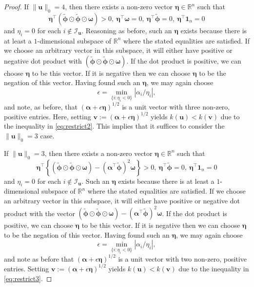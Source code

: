 \documentclass[12pt]{article}
\newcommand{\bl}[1]{{\mathbf #1}}
\newcommand{\bs}[1]{\boldsymbol #1}
\begin{document}
\begin{proof}
If $\|\bl{u}\|_0 = 4$, then there exists a non-zero vector $\bs{\eta} \in \mathbb{R}^n$ such that
\begin{equation}\label{eq:restrict2}
    \bs{\eta}^\top (\tilde{\bs{\phi}} \odot \tilde{\bs{\phi}} \odot \bs{\omega}) > 0,~\bs{\eta}^\top \bs{\omega}= 0,~ \bs{\eta}^\top \tilde{\bs{\phi}}=0, ~ \bs{\eta}^\top \bl{1}_n =0
\end{equation}
and $\eta_i = 0$ for each $i \notin \mathcal{I}_{\bl{u}}$. Reasoning as before, such an $\bs{\eta}$ exists because there is at least a $1$-dimensional subspace of $\mathbb{R}^n$ where the stated equalities are satisfied. If we choose an arbitrary vector in this subspace, it will either have positive or negative dot product with $(\tilde{\bs{\phi}} \odot \tilde{\bs{\phi}} \odot \bs{\omega})$. If the dot product is positive, we can choose $\bs{\eta}$ to be this vector. If it is negative then we can choose $\bs{\eta}$ to be the negation of this vector. Having found such an $\bs{\eta}$, we may again choose
\begin{equation*}
	\epsilon = \min_{\{i : \eta_i < 0\}} |\alpha_i / \eta_i|,
\end{equation*}
and note, as before, that $(\bs{\alpha} + \epsilon \bs{\eta})^{1/2}$ is a unit vector with three non-zero, positive entries. Here, setting $\bl{v} := (\bs{\alpha} + \epsilon \bs{\eta})^{1/2}$ yields $k(\bl{u}) < k(\bl{v})$ due to the inequality in \eqref{eq:restrict2}. This implies that it suffices to consider the $\|\bl{u}\|_0 = 3$ case.

If $\|\bl{u}\|_0 = 3$, then there exists a non-zero vector $\bs{\eta} \in \mathbb{R}^n$ such that
\begin{equation}\label{eq:restrict3}
    \bs{\eta}^\top \left\{(\tilde{\bs{\phi}} \odot \tilde{\bs{\phi}} \odot \bs{\omega}) - (\bs{\alpha}^\top \tilde{\bs{\phi}})^2 \bs{\omega} \right\} > 0,~ \bs{\eta}^\top \tilde{\bs{\phi}}=0, ~ \bs{\eta}^\top \bl{1}_n =0
\end{equation}
and $\eta_i = 0$ for each $i \notin \mathcal{I}_{\bl{u}}$. Such an $\bs{\eta}$ exists because there is at least a $1$-dimensional subspace of $\mathbb{R}^n$ where the stated equalities are satisfied. If we choose an arbitrary vector in this subspace, it will either have positive or negative dot product with the vector $(\tilde{\bs{\phi}} \odot \tilde{\bs{\phi}} \odot \bs{\omega}) - (\bs{\alpha}^\top \tilde{\bs{\phi}})^2 \bs{\omega}$. If the dot product is positive, we can choose $\bs{\eta}$ to be this vector. If it is negative then we can choose $\bs{\eta}$ to be the negation of this vector. Having found such an $\bs{\eta}$, we may again choose
\begin{equation*}
	\epsilon = \min_{\{i : \eta_i < 0\}} |\alpha_i / \eta_i|,
\end{equation*}
and note as before that $(\bs{\alpha} + \epsilon \bs{\eta})^{1/2}$ is a unit vector with two non-zero, positive entries. Setting $\bl{v} := (\bs{\alpha} + \epsilon \bs{\eta})^{1/2}$ yields $k(\bl{u}) < k(\bl{v})$ due to the inequality in \eqref{eq:restrict3}.


\end{proof}
\end{document}
